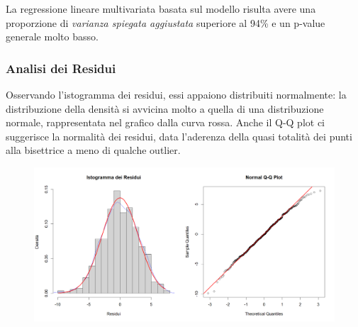 \documentclass[11pt,a4paper]{article}
\begin{document}
La regressione lineare multivariata basata sul modello risulta avere una proporzione di \emph{varianza spiegata aggiustata} superiore al 94\% e un p-value generale molto basso.

\subsubsection{Analisi dei Residui}
Osservando l'istogramma dei residui, essi appaiono distribuiti normalmente: la distribuzione della densità si avvicina molto a quella di una distribuzione normale, rappresentata nel grafico dalla curva rossa. 
Anche il Q-Q plot ci suggerisce la normalità dei residui, data l'aderenza della quasi totalità dei punti alla bisettrice a meno di qualche outlier.  

\begin{figure}[h]
    \hspace{-1.5cm}
	\includegraphics[scale=0.6]{imgs/residuals_analysis_linear_model.png}
    \end{figure}
\vspace{-0.4cm}
\end{document}
